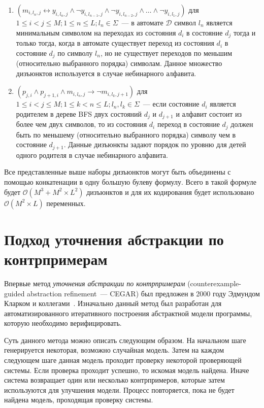 \begin{enumerate}
  \item $\left(m_{i,l_{n},j} \leftrightarrow y_{i,l_{n},j} \wedge \neg y_{i,l_{n - 1}, j} \wedge \neg y_{i,l_{n - 2}, j} \wedge \ldots \wedge \neg y_{i,l_{1},j} \right)$ для $1 \leq i < j \leq M; 1 \leq n \leq L;l_{n} \in \Sigma$~{---} в автомате $\mathcal{D}$ символ $l_{n}$ является минимальным символом на переходах из состояния $d_{i}$ в состояние $d_{j}$ тогда и только тогда, когда в автомате существует переход из состояния $d_{i}$ в состояние $d_{j}$ по символу $l_{n}$, но не существует переходов по меньшим (относительно выбранного порядка) символам.
  Данное множество дизъюнктов используется в случае небинарного алфавита.

  \item $\left(p_{j,i} \wedge p_{j + 1, i} \wedge m_{i,l_{n}, j} \rightarrow \neg m_{i, l_{k}, j + 1}\right)$ для $1 \leq i < j \leq M; 1 \leq k < n \leq L;l_n,l_k \in \Sigma$~{---} если состояние $d_{i}$ является родителем в дереве BFS двух состояний $d_{j}$ и $d_{j + 1}$ и алфавит состоит из более чем двух символов, то из состояния $d_{i}$ переход в состояние $d_{j}$ должен быть по меньшему (относительно выбранного порядка) символу чем в состояние $d_{j + 1}$.
  Данные дизъюнкты задают порядок по уровню для детей одного родителя в случае небинарного алфавита.
\end{enumerate}

Все представленные выше наборы дизъюнктов могут быть объединены с помощью конкатенации в одну большую булеву формулу. Всего в такой формуле будет $\mathcal{O}(M^{3} + M^{2} \times L^{2})$ дизъюнктов и для их кодирования будет использовано $\mathcal{O}(M^2 \times L)$ переменных.


\section{Подход уточнения абстракции по контрпримерам}
\label{sec:review:cegar}

Впервые метод \emph{уточнения абстракции по контрпримерам} (counterexample-guided abstraction refinement~--- CEGAR) был предложен в 2000 году Эдмундом Кларком и коллегами~\cite{DBLP:conf/cav/ClarkeGJLV00}.
Изначально данный метод был разработан для автоматизированного итеративного построения абстрактной модели программы, которую необходимо верифицировать.

Суть данного метода можно описать следующим образом.
На начальном шаге генерируется некоторая, возможно случайная модель. 
Затем на каждом следующем шаге данная модель проходит проверку некоторой проверяющей системы.
Если проверка проходит успешно, то искомая модель найдена.
Иначе система возвращает один или несколько контрпримеров, которые затем используются для улучшения модели.
Процесс повторяется, пока не будет найдена модель, проходящая проверку системы.

